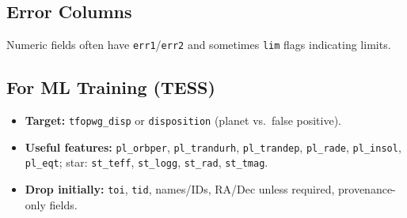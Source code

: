 \documentclass{article}
\begin{document}
\subsection*{Error Columns}
Numeric fields often have \texttt{err1}/\texttt{err2} and sometimes \texttt{lim} flags indicating limits.

\subsection*{For ML Training (TESS)}
\begin{itemize}
\item \textbf{Target:} \texttt{tfopwg\_disp} or \texttt{disposition} (planet vs.\ false positive).
\item \textbf{Useful features:} \texttt{pl\_orbper}, \texttt{pl\_trandurh}, \texttt{pl\_trandep}, \texttt{pl\_rade}, \texttt{pl\_insol}, \texttt{pl\_eqt}; star: \texttt{st\_teff}, \texttt{st\_logg}, \texttt{st\_rad}, \texttt{st\_tmag}.
\item \textbf{Drop initially:} \texttt{toi}, \texttt{tid}, names/IDs, RA/Dec unless required, provenance-only fields.
\end{itemize}
\end{document}
